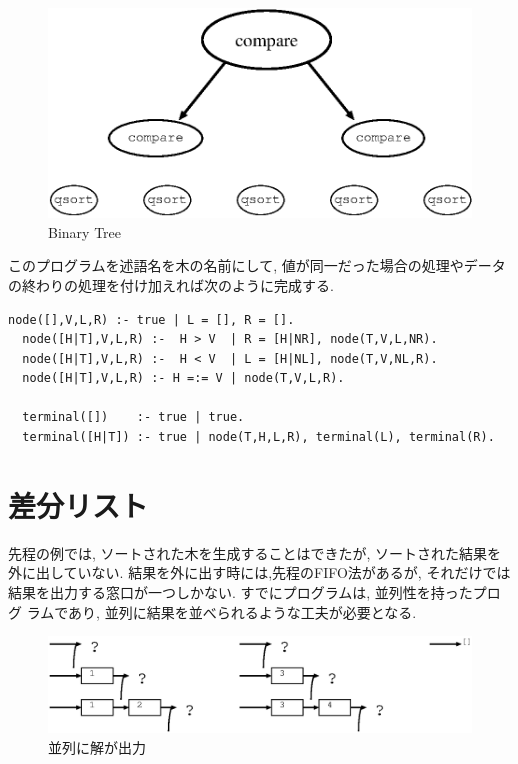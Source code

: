 \documentclass[a4,titlepage]{jsreport}
\begin{document}
\begin{figure}[htbp]
  \begin{center}
    \includegraphics[width=.6\textwidth]{fig/dlt4.eps}
    \caption{Binary Tree}
  \end{center}
\end{figure}

  このプログラムを述語名を木の名前にして,  値が同一だった場合の処理やデータ
の終わりの処理を付け加えれば次のように完成する.  

\begin{Verbatim}[baselinestretch=0.8]
  node([],V,L,R) :- true | L = [], R = [].
  node([H|T],V,L,R) :-  H > V  | R = [H|NR], node(T,V,L,NR).
  node([H|T],V,L,R) :-  H < V  | L = [H|NL], node(T,V,NL,R).
  node([H|T],V,L,R) :- H =:= V | node(T,V,L,R).

  terminal([])    :- true | true.
  terminal([H|T]) :- true | node(T,H,L,R), terminal(L), terminal(R).
\end{Verbatim}


\section{差分リスト}
  先程の例では,  ソートされた木を生成することはできたが,  ソートされた結果を
外に出していない.  結果を外に出す時には,先程のFIFO法があるが,  それだけでは
結果を出力する窓口が一つしかない.  すでにプログラムは,  並列性を持ったプログ
ラムであり,  並列に結果を並べられるような工夫が必要となる.  

\begin{figure}[htbp]
  \begin{center}
    \includegraphics[width=.8\textwidth]{fig/dlt5.eps}
    \caption{並列に解が出力}
  \end{center}
\end{figure}
\end{document}
